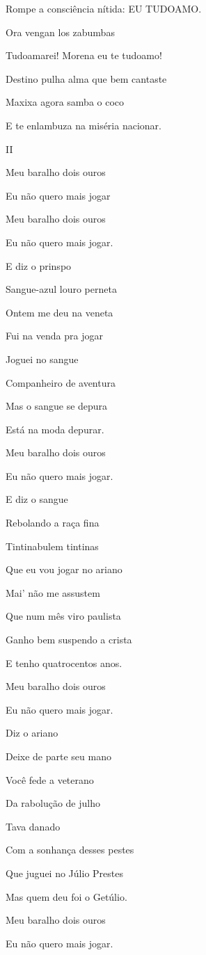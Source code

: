 Rompe a consciência nítida: EU TUDOAMO.

Ora vengan los zabumbas

Tudoamarei! Morena eu te tudoamo!

Destino pulha alma que bem cantaste

Maxixa agora samba o coco

E te enlambuza na miséria nacionar.

II

Meu baralho dois ouros

Eu não quero mais jogar

Meu baralho dois ouros

Eu não quero mais jogar.

E diz o prinspo

Sangue-azul louro perneta

Ontem me deu na veneta

Fui na venda pra jogar

Joguei no sangue

Companheiro de aventura

Mas o sangue se depura

Está na moda depurar.

Meu baralho dois ouros

Eu não quero mais jogar.

E diz o sangue

Rebolando a raça fina

Tintinabulem tintinas

Que eu vou jogar no ariano

Mai' não me assustem

Que num mês viro paulista

Ganho bem suspendo a crista

E tenho quatrocentos anos.

Meu baralho dois ouros

Eu não quero mais jogar.

Diz o ariano

Deixe de parte seu mano

Você fede a veterano

Da rabolução de julho

Tava danado

Com a sonhança desses pestes

Que juguei no Júlio Prestes

Mas quem deu foi o Getúlio.

Meu baralho dois ouros

Eu não quero mais jogar.

